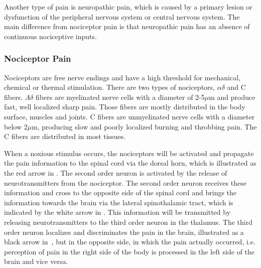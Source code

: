 Another type of pain is neuropathic pain, which is caused by a primary lesion or dysfunction of the peripheral nervous system or central nervous system. The main difference from nociceptor pain is that neuropathic pain has an absence of continuous nociceptive inputs. \cite{Kerstman2013}

\subsubsection{Nociceptor Pain}
Nociceptors are free nerve endings and have a high threshold for mechanical, chemical or thermal stimulation. There are two types of nociceptors, $\alpha\delta$ and C fibers. $A\delta$ fibers are myelinated nerve cells with a diameter of 2-5$\mu$m and produce fast, well localized sharp pain. Those fibers are mostly distributed in the body surface, muscles and joints. C fibers are unmyelinated nerve cells with a diameter below 2$\mu$m, producing slow and poorly localized burning and throbbing pain. The C fibers are distributed in most tissues. \cite{Steeds2013}

When a noxious stimulus occurs, the nociceptors will be activated and propagate the pain information to the spinal cord via the dorsal horn, which is illustrated as the red arrow in . The second order neuron is activated by the release of neurotransmitters from the nociceptor. The second order neuron receives these information and cross  to the opposite side of the spinal cord and brings the information towards the brain via the lateral spinothalamic tract, which is indicated by the white arrow in . This information will be transmitted by releasing neurotransmitters to the third order neuron in the thalamus. The third order neuron localizes and discriminates the pain in the brain, illustrated as a black arrow in~, but in the opposite side, in which the pain actually occurred, i.e. perception of pain in the right side of the body is processed in the left side of the brain and vice versa. \cite{Martini2012} 


